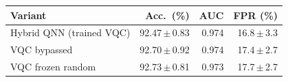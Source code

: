 \begin{tabular}{lrrr}
\toprule
Variant & Acc.\ (\%) & AUC & FPR (\%) \\
\midrule
Hybrid QNN (trained VQC) & 92.47\,$\pm$\,0.83 & 0.974 & 16.8\,$\pm$\,3.3 \\
VQC bypassed & 92.70\,$\pm$\,0.92 & 0.974 & 17.4\,$\pm$\,2.7 \\
VQC frozen random & 92.73\,$\pm$\,0.81 & 0.973 & 17.7\,$\pm$\,2.7 \\
\bottomrule
\end{tabular}
